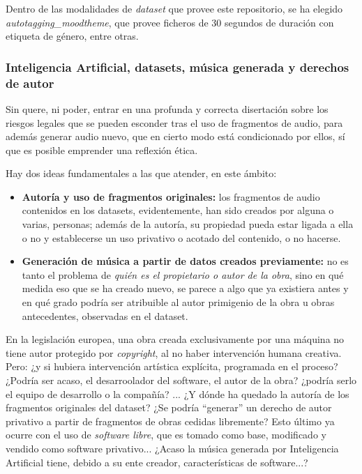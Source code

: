 Dentro de las modalidades de \emph{dataset} que provee este repositorio, se ha elegido \emph{autotagging\_moodtheme}, que provee ficheros de 30 segundos de duración con etiqueta de género, entre otras.

\subsubsection{Inteligencia Artificial, datasets, música generada y derechos de autor}
Sin quere, ni poder, entrar en una profunda y correcta disertación sobre los riesgos legales que se pueden esconder tras el uso de fragmentos de audio, para además generar audio nuevo, que en cierto modo está condicionado por ellos, sí que es posible emprender una reflexión ética.

Hay dos ideas fundamentales a las que atender, en este ámbito:
\begin{itemize}
    \item \textbf{Autoría y uso de fragmentos originales:} los fragmentos de audio contenidos en los datasets, evidentemente, han sido creados por alguna o varias, personas; además de la autoría, su propiedad pueda estar ligada a ella o no y establecerse un uso privativo o acotado del contenido, o no hacerse.
    \item \textbf{Generación de música a partir de datos creados previamente:} no es tanto el problema de \emph{quién es el propietario o autor de la obra}, sino en qué medida eso que se ha creado nuevo, se parece a algo que ya existiera antes y en qué grado podría ser atribuible al autor primigenio de la obra u obras antecedentes, observadas en el dataset.
\end{itemize}

En la legislación europea, una obra creada exclusivamente por una máquina no tiene autor protegido por \emph{copyright}, al no haber intervención humana creativa. Pero: ¿y si hubiera intervención artística explícita, programada en el proceso? ¿Podría ser acaso, el desarroolador del software, el autor de la obra? ¿podría serlo el equipo de desarrollo o la compañía?
... ¿Y dónde ha quedado la autoría de los fragmentos originales del dataset? ¿Se podría ``generar'' un derecho de autor privativo a partir de fragmentos de obras cedidas libremente?
Esto último ya ocurre con el uso de \emph{software libre}, que es tomado como base, modificado y vendido como software privativo... ¿Acaso la música generada por Inteligencia Artificial tiene, debido a su ente creador, características de software...?

